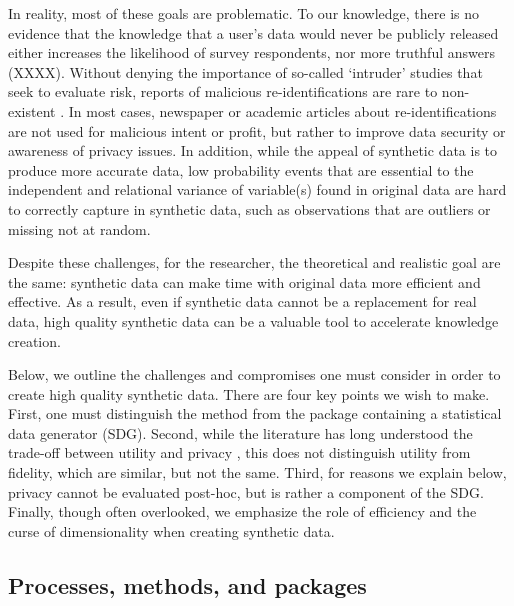 \documentclass[runningheads]{llncs}
\begin{document}
In reality, most of these goals are problematic.  To our knowledge, there is no evidence that the knowledge that a user's data would never be publicly released either increases the likelihood of survey respondents, nor more truthful answers (XXXX).  Without denying the importance of so-called `intruder' studies that seek to evaluate risk, reports of malicious re-identifications are rare to non-existent \cite{francis_wagner_yyyy}.  In most cases, newspaper or academic articles about re-identifications are not used for malicious intent or profit, but rather to improve data security or awareness of privacy issues.  In addition, while the appeal of synthetic data is to produce more accurate data, low probability events that are essential to the independent and relational variance of variable(s) found in original data are hard to correctly capture in synthetic data, such as observations that are outliers or missing not at random.  

Despite these challenges, for the researcher, the theoretical and realistic goal are the same: synthetic data can make time with original data more efficient and effective.  As a result, even if synthetic data cannot be a replacement for real data, high quality synthetic data can be a valuable tool to accelerate knowledge creation.  

Below, we outline the challenges and compromises one must consider in order to create high quality synthetic data.  There are four key points we wish to make.  First, one must distinguish the method from the package containing a statistical data generator (SDG).  Second, while the literature has long understood the trade-off between utility and privacy \cite{duncan2004database}, this does not distinguish utility from fidelity, which are similar, but not the same.  Third, for reasons we explain below, privacy cannot be evaluated post-hoc, but is rather a component of the SDG.  Finally, though often overlooked, we emphasize the role of efficiency and the curse of dimensionality when creating synthetic data.  

\subsection{Processes, methods, and packages}
\end{document}
